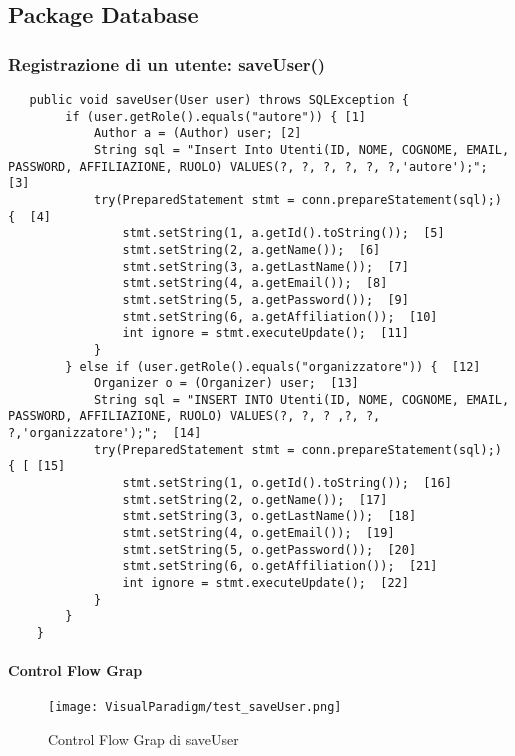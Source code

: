 \subsection{Package Database}
\label{sec:test_strutturale_package_database}

\subsubsection{Registrazione di un utente: saveUser()}
\begin{lstlisting}
   public void saveUser(User user) throws SQLException {
        if (user.getRole().equals("autore")) { [1]
            Author a = (Author) user; [2]
            String sql = "Insert Into Utenti(ID, NOME, COGNOME, EMAIL, PASSWORD, AFFILIAZIONE, RUOLO) VALUES(?, ?, ?, ?, ?, ?,'autore');";  [3]
            try(PreparedStatement stmt = conn.prepareStatement(sql);) {  [4]
                stmt.setString(1, a.getId().toString());  [5]
                stmt.setString(2, a.getName());  [6]
                stmt.setString(3, a.getLastName());  [7]
                stmt.setString(4, a.getEmail());  [8]
                stmt.setString(5, a.getPassword());  [9]
                stmt.setString(6, a.getAffiliation());  [10]
                int ignore = stmt.executeUpdate();  [11]
            }
        } else if (user.getRole().equals("organizzatore")) {  [12]
            Organizer o = (Organizer) user;  [13]
            String sql = "INSERT INTO Utenti(ID, NOME, COGNOME, EMAIL, PASSWORD, AFFILIAZIONE, RUOLO) VALUES(?, ?, ? ,?, ?, ?,'organizzatore');";  [14]
            try(PreparedStatement stmt = conn.prepareStatement(sql);) { [ [15]
                stmt.setString(1, o.getId().toString());  [16]
                stmt.setString(2, o.getName());  [17]
                stmt.setString(3, o.getLastName());  [18]
                stmt.setString(4, o.getEmail());  [19]
                stmt.setString(5, o.getPassword());  [20]
                stmt.setString(6, o.getAffiliation());  [21]
                int ignore = stmt.executeUpdate();  [22]
            }
        }
    }
\end{lstlisting}
\paragraph{Control Flow Grap}
\begin{figure}[ht]
  \centering
  \texttt{[image: VisualParadigm/test\_saveUser.png]}
  \caption{Control Flow Grap di saveUser}
  \label{fig:cfg_di saveUser}
\end{figure}
